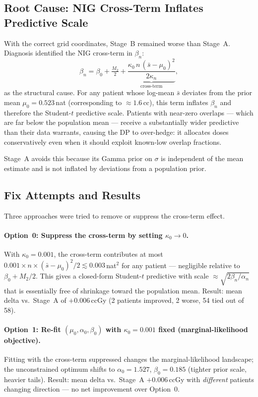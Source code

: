 \documentclass[11pt]{article}
\begin{document}
\subsection{Root Cause: NIG Cross-Term Inflates Predictive Scale}

With the correct grid coordinates, Stage~B remained worse than Stage~A.
Diagnosis identified the NIG cross-term in $\beta_n$:
\[
  \beta_n = \beta_0 + \tfrac{M_2}{2}
  + \underbrace{\frac{\kappa_0\,n\,(\bar s - \mu_0)^2}{2\kappa_n}}_{\text{cross-term}},
\]
as the structural cause.  For any patient whose log-mean $\bar s$ deviates from the
prior mean $\mu_0 = 0.523$\,nat (corresponding to $\approx 1.6$\,cc), this term
inflates $\beta_n$ and therefore the Student-$t$ predictive scale.  Patients with
near-zero overlaps --- which are far below the population mean --- receive a
substantially wider predictive than their data warrants, causing the DP to
over-hedge: it allocates doses conservatively even when it should exploit known-low
overlap fractions.

Stage~A avoids this because its Gamma prior on $\sigma$ is independent of the mean
estimate and is not inflated by deviations from a population prior.

\subsection{Fix Attempts and Results}

Three approaches were tried to remove or suppress the cross-term effect.

\paragraph{Option~0: Suppress the cross-term by setting $\kappa_0 \to 0$.}
With $\kappa_0 = 0.001$, the cross-term contributes at most
$0.001 \times n \times (\bar s - \mu_0)^2 / 2 \lesssim 0.003$\,nat$^2$ for any
patient --- negligible relative to $\beta_0 + M_2/2$.  This gives a closed-form
Student-$t$ predictive with scale $\approx \sqrt{2\beta_n / \alpha_n}$ that is
essentially free of shrinkage toward the population mean.  Result: mean delta vs.\
Stage~A of $+0.006$\,ccGy (2 patients improved, 2 worse, 54 tied out of 58).

\paragraph{Option~1: Re-fit $(\mu_0, \alpha_0, \beta_0)$ with $\kappa_0 = 0.001$
fixed (marginal-likelihood objective).}
Fitting with the cross-term suppressed changes the marginal-likelihood landscape;
the unconstrained optimum shifts to $\alpha_0 = 1.527$, $\beta_0 = 0.185$
(tighter prior scale, heavier tails).  Result: mean delta vs.\ Stage~A
$+0.006$\,ccGy with \emph{different} patients changing direction --- no net
improvement over Option~0.
\end{document}
